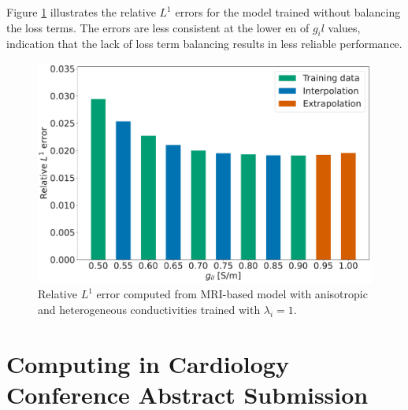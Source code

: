 Figure \ref{fig:RL1_anisotropic_no_relobralo} illustrates the relative $L^1$ errors for the model trained without balancing the loss terms. The errors are less consistent at the lower en of $g_il$ values, indication that the lack of loss term balancing results in less reliable performance.
\begin{figure}[H]
  \centering
  \includegraphics[width=0.8\linewidth]{Figs/Anisotropic/L1_error_bar_plot_no_relobralo.pdf}
  \caption{Relative $L^1$ error computed from MRI-based model with anisotropic and heterogeneous conductivities trained with $\lambda_i=1$.}
  \label{fig:RL1_anisotropic_no_relobralo}
\end{figure}


\chapter{Computing in Cardiology Conference Abstract Submission}

